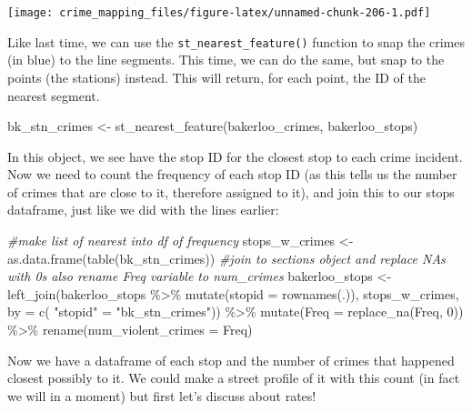 \documentclass[
  krantz2]{krantz}
\makeatletter
\newenvironment{Shaded}{\begin{snugshade}}{\end{snugshade}}
\newcommand{\AttributeTok}[1]{\textcolor[rgb]{0.61,0.61,0.61}{#1}}
\newcommand{\CommentTok}[1]{\textcolor[rgb]{0.37,0.37,0.37}{\textit{#1}}}
\newcommand{\DecValTok}[1]{\textcolor[rgb]{0.06,0.06,0.06}{#1}}
\newcommand{\FunctionTok}[1]{\textcolor[rgb]{0,0,0}{#1}}
\newcommand{\NormalTok}[1]{#1}
\newcommand{\OtherTok}[1]{\textcolor[rgb]{0.37,0.37,0.37}{#1}}
\newcommand{\SpecialCharTok}[1]{\textcolor[rgb]{0,0,0}{#1}}
\newcommand{\StringTok}[1]{\textcolor[rgb]{0.5,0.5,0.5}{#1}}
\newenvironment{kframe}{%
\medskip{}
\setlength{\fboxsep}{.8em}
 \def\at@end@of@kframe{}%
 \ifinner\ifhmode%
  \def\at@end@of@kframe{\end{minipage}}%
  \begin{minipage}{\columnwidth}%
 \fi\fi%
 \def\FrameCommand##1{\hskip\@totalleftmargin \hskip-\fboxsep
 \colorbox{shadecolor}{##1}\hskip-\fboxsep
     \hskip-\linewidth \hskip-\@totalleftmargin \hskip\columnwidth}%
 \MakeFramed {\advance\hsize-\width
   \@totalleftmargin\z@ \linewidth\hsize
   \@setminipage}}%
 {\par\unskip\endMakeFramed%
 \at@end@of@kframe}
\renewenvironment{Shaded}{\begin{kframe}}{\end{kframe}}
\makeatother
\begin{document}
\texttt{[image: crime\_mapping\_files/figure-latex/unnamed-chunk-206-1.pdf]}

Like last time, we can use the \texttt{st\_nearest\_feature()} function to snap the crimes (in blue) to the line segments. This time, we can do the same, but snap to the points (the stations) instead. This will return, for each point, the ID of the nearest segment.

\begin{Shaded}
\begin{Highlighting}[]
\NormalTok{bk\_stn\_crimes }\OtherTok{\textless{}{-}} \FunctionTok{st\_nearest\_feature}\NormalTok{(bakerloo\_crimes, bakerloo\_stops)}
\end{Highlighting}
\end{Shaded}

In this object, we see have the stop ID for the closest stop to each crime incident. Now we need to count the frequency of each stop ID (as this tells us the number of crimes that are close to it, therefore assigned to it), and join this to our stops dataframe, just like we did with the lines earlier:

\begin{Shaded}
\begin{Highlighting}[]
\CommentTok{\#make list of nearest into df of frequency}
\NormalTok{stops\_w\_crimes }\OtherTok{\textless{}{-}} \FunctionTok{as.data.frame}\NormalTok{(}\FunctionTok{table}\NormalTok{(bk\_stn\_crimes))}
\CommentTok{\#join to sections object and replace NAs with 0s also rename Freq variable to num\_crimes}
\NormalTok{bakerloo\_stops }\OtherTok{\textless{}{-}} \FunctionTok{left\_join}\NormalTok{(bakerloo\_stops }\SpecialCharTok{\%\textgreater{}\%} \FunctionTok{mutate}\NormalTok{(}\AttributeTok{stopid =} \FunctionTok{rownames}\NormalTok{(.)), }
\NormalTok{                            stops\_w\_crimes, }
                            \AttributeTok{by =} \FunctionTok{c}\NormalTok{( }\StringTok{"stopid"} \OtherTok{=} \StringTok{"bk\_stn\_crimes"}\NormalTok{)) }\SpecialCharTok{\%\textgreater{}\%} 
  \FunctionTok{mutate}\NormalTok{(}\AttributeTok{Freq =} \FunctionTok{replace\_na}\NormalTok{(Freq, }\DecValTok{0}\NormalTok{)) }\SpecialCharTok{\%\textgreater{}\%} 
  \FunctionTok{rename}\NormalTok{(}\AttributeTok{num\_violent\_crimes =}\NormalTok{ Freq)}
\end{Highlighting}
\end{Shaded}

Now we have a dataframe of each stop and the number of crimes that happened closest possibly to it. We could make a street profile of it with this count (in fact we will in a moment) but first let's discuss about rates!
\end{document}
